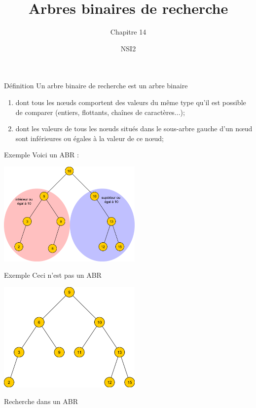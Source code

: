 \documentclass[10pt]{beamer}
\title{Arbres binaires de recherche}
\subtitle{Chapitre 14}
\author{NSI2}
\begin{document}
\maketitle

\begin{frame}{Définition}
Un arbre binaire de recherche est un arbre binaire\pause
\begin{enumerate}[--]
    \item dont tous les n\oe uds comportent des valeurs du même type qu'il est possible de comparer (entiers, flottants, chaînes de caractères...);\pause
    \item dont les valeurs de tous les n\oe uds situés dans le \alert{sous-arbre gauche} d'un n\oe ud sont \alert{inférieures ou égales} à la valeur de ce n\oe ud;\pause
\end{enumerate}
 
\end{frame}
\begin{frame}{Exemple}
Voici un ABR :
\begin{center}
\includegraphics[width=7cm]{img/abr1}
\end{center}
\end{frame}
\begin{frame}{Exemple}
Ceci n'est pas un ABR
    \begin{center}
        \includegraphics[width=7cm]{img/abr2}
    \end{center}
\end{frame}
\begin{frame}{Recherche dans un ABR}
        \begin{center}
    \end{center}
\end{frame}
\end{document}
